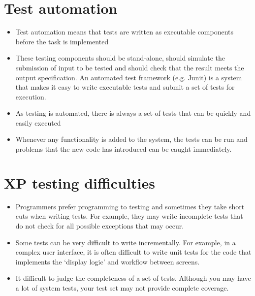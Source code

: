 \section{ Test automation}
\begin{itemize}
\item Test automation means that tests are written as executable components before the task is implemented

\item These testing components should be stand-alone, should simulate the submission of input to be tested and should check that the result meets the output specification. An automated test framework (e.g. Junit) is a system that makes it easy to write executable tests and submit a set of tests for execution.

\item As testing is automated, there is always a set of tests that can be quickly and easily executed

\item Whenever any functionality is added to the system, the tests can be run and problems that the new code has introduced can be caught immediately.


\end{itemize}
\section{ XP testing difficulties}
\begin{itemize}
\item Programmers prefer programming to testing and sometimes they take short cuts when writing tests. For example, they may write incomplete tests that do not check for all possible exceptions that may occur.

\item Some tests can be very difficult to write incrementally. For example, in a complex user interface, it is often difficult to write unit tests for the code that implements the ‘display logic’ and workflow between screens.

\item It difficult to judge the completeness of a set of tests. Although you may have a lot of system tests, your test set may not provide complete coverage.


\end{itemize}
